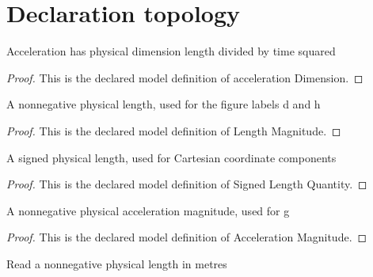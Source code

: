 \section{Declaration topology}
\begin{definition}
  \label{def:physics:phyx-mini-0683:phyxminiproblems-problemphyxmini0683-accelerationdimension}
  Acceleration has physical dimension length divided by time squared
\end{definition}
\begin{proof}
  This is the declared model definition of acceleration Dimension.
\end{proof}
\begin{definition}
  \label{def:physics:phyx-mini-0683:phyxminiproblems-problemphyxmini0683-lengthmagnitude}
  A nonnegative physical length, used for the figure labels d and h
\end{definition}
\begin{proof}
  This is the declared model definition of Length Magnitude.
\end{proof}
\begin{definition}
  \label{def:physics:phyx-mini-0683:phyxminiproblems-problemphyxmini0683-signedlengthquantity}
  A signed physical length, used for Cartesian coordinate components
\end{definition}
\begin{proof}
  This is the declared model definition of Signed Length Quantity.
\end{proof}
\begin{definition}
  \label{def:physics:phyx-mini-0683:phyxminiproblems-problemphyxmini0683-accelerationmagnitude}
  A nonnegative physical acceleration magnitude, used for g
\end{definition}
\begin{proof}
  This is the declared model definition of Acceleration Magnitude.
\end{proof}
\begin{definition}
  \label{def:physics:phyx-mini-0683:phyxminiproblems-problemphyxmini0683-lengthmagnitudeinmeters}
  Read a nonnegative physical length in metres
\end{definition}
